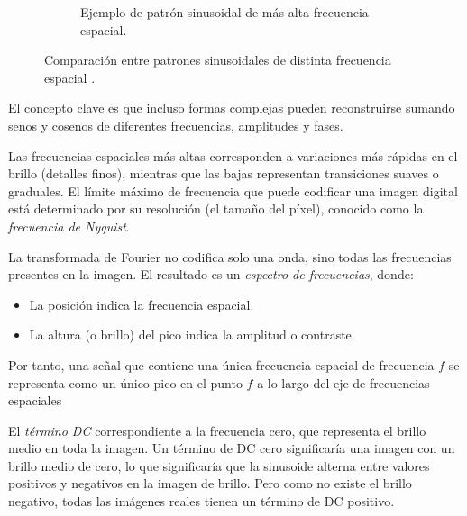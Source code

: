\begin{figure}[!htbp]
\begin{subfigure}[b]{0.45\textwidth}
        \caption{Ejemplo de patrón sinusoidal de más alta frecuencia espacial.}
        \label{fig:sinusoide_alta}
    \end{subfigure}
    \caption{Comparación entre patrones sinusoidales de distinta frecuencia espacial \parencite{leharFourier}.}
    \label{fig:comparacion_sinusoidales}
\end{figure}

El concepto clave es que incluso formas complejas pueden reconstruirse sumando senos y cosenos de diferentes frecuencias, amplitudes y fases.

Las frecuencias espaciales más altas corresponden a variaciones más rápidas en el brillo (detalles finos), mientras que las bajas representan transiciones suaves o graduales. El límite máximo de frecuencia que puede codificar una imagen digital está determinado por su resolución (el tamaño del píxel), conocido como la \emph{frecuencia de Nyquist}.

La transformada de Fourier no codifica solo una onda, sino todas las frecuencias presentes en la imagen. El resultado es un \emph{espectro de frecuencias}, donde:
\begin{itemize}
    \item La posición indica la frecuencia espacial.
    \item La altura (o brillo) del pico indica la amplitud o contraste.
\end{itemize}

Por tanto, una señal que contiene una única frecuencia espacial de frecuencia $f$ se representa como un único pico en el punto $f$ a lo largo del eje de frecuencias espaciales

El \emph{término DC} correspondiente a la frecuencia cero, que representa el brillo medio en toda la imagen. Un término de DC cero significaría una imagen con un brillo medio de cero, lo que significaría que la sinusoide alterna entre valores positivos y negativos en la imagen de brillo. Pero como no existe el brillo negativo, todas las imágenes reales tienen un término de DC positivo.

